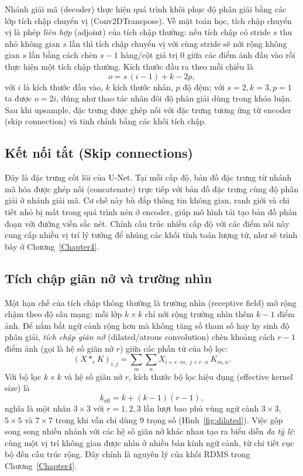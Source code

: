 Nhánh giải mã (decoder) thực hiện quá trình khôi phục độ phân giải bằng các lớp tích chập chuyển vị (Conv2DTranspose). Về mặt toán học, tích chập chuyển vị là phép \emph{liên hợp} (adjoint) của tích chập thường: nếu tích chập có stride $s$ thu nhỏ không gian $s$ lần thì tích chập chuyển vị với cùng stride sẽ nới rộng không gian $s$ lần bằng cách chèn $s-1$ hàng/cột giá trị $0$ giữa các điểm ảnh đầu vào rồi thực hiện một tích chập thường. Kích thước đầu ra theo mỗi chiều là
\begin{equation}
    o = s\,(i-1) + k - 2p,
\end{equation}
với $i$ là kích thước đầu vào, $k$ kích thước nhân, $p$ độ đệm; với $s=2, k=3, p=1$ ta được $o=2i$, đúng như thao tác nhân đôi độ phân giải dùng trong khóa luận. Sau khi upsample, đặc trưng được ghép nối với đặc trưng tương ứng từ encoder (skip connection) và tinh chỉnh bằng các khối tích chập.
\subsection{Kết nối tắt (Skip connections)}
Đây là đặc trưng cốt lõi của U-Net. Tại mỗi cấp độ, bản đồ đặc trưng từ nhánh mã hóa được ghép nối (concatenate) trực tiếp với bản đồ đặc trưng cùng độ phân giải ở nhánh giải mã. Cơ chế này bù đắp thông tin không gian, ranh giới và chi tiết nhỏ bị mất trong quá trình nén ở encoder, giúp mô hình tái tạo bản đồ phân đoạn với đường viền sắc nét. Chính cấu trúc nhiều cấp độ với các điểm nối này cung cấp nhiều vị trí lý tưởng để nhúng các khối tính toán lượng tử, như sẽ trình bày ở Chương~\ref{Chapter4}.

\subsection{Tích chập giãn nở và trường nhìn}
\label{subsec:dilated}
Một hạn chế của tích chập thông thường là trường nhìn (receptive field) mở rộng chậm theo độ sâu mạng: mỗi lớp $k\times k$ chỉ nới rộng trường nhìn thêm $k-1$ điểm ảnh. Để nắm bắt ngữ cảnh rộng hơn mà không tăng số tham số hay hy sinh độ phân giải, \emph{tích chập giãn nở} (dilated/atrous convolution) \cite{yu2016dilated} chèn khoảng cách $r-1$ điểm ảnh (gọi là hệ số giãn nở $r$) giữa các phần tử của bộ lọc:
\begin{equation}
    (X *_{r} K)_{i,j} = \sum_{m}\sum_{n} X_{i+r\cdot m,\; j+r\cdot n}\, K_{m,n}.
\end{equation}
Với bộ lọc $k\times k$ và hệ số giãn nở $r$, kích thước bộ lọc hiệu dụng (effective kernel size) là
\begin{equation}
    k_{\text{eff}} = k + (k-1)(r-1),
\end{equation}
nghĩa là một nhân $3\times 3$ với $r=1,2,3$ lần lượt bao phủ vùng ngữ cảnh $3\times 3$, $5\times 5$ và $7\times 7$ trong khi vẫn chỉ dùng $9$ trọng số (Hình~\ref{fig:dilated}). Việc gộp song song nhiều nhánh với các hệ số giãn nở khác nhau tạo ra biểu diễn \emph{đa tỷ lệ}: cùng một vị trí không gian được nhìn ở nhiều bán kính ngữ cảnh, từ chi tiết cục bộ đến cấu trúc rộng. Đây chính là nguyên lý của khối RDMS trong Chương~\ref{Chapter4}.

